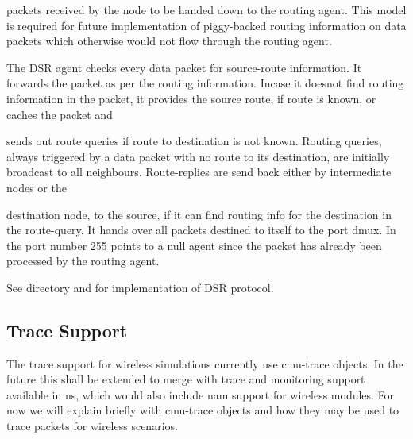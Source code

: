 packets received by the node to be handed down to the routing agent. This model is required for future implementation of piggy-backed routing information on data packets which otherwise would not flow through the routing agent.

The DSR agent checks every data packet for source-route information. It forwards the packet as per the routing information. Incase it doesnot find routing information in the packet, it provides the source route, if route is known, or caches the packet and





















 sends out route queries if route to destination is not known. Routing queries, always triggered by a data packet with no route to its destination, are initially broadcast to all neighbours. Route-replies are send back either by intermediate nodes or the 





















destination node, to the source, if it can find routing info for the destination in the route-query.  It hands over all packets destined to itself to the port dmux.
In  the port number 255 points to a null agent since the packet has already been processed by the routing agent.

See  directory and  for implementation
of DSR protocol. 


\subsection{Trace Support}
\label{sec:mobile-trace}

The trace support for wireless simulations currently use cmu-trace
objects. In the future this shall be extended to merge with trace and
monitoring support available in ns, which would also include nam support
for wireless modules. For now we will explain briefly with cmu-trace
objects and how they may be used to trace packets for wireless scenarios. 

